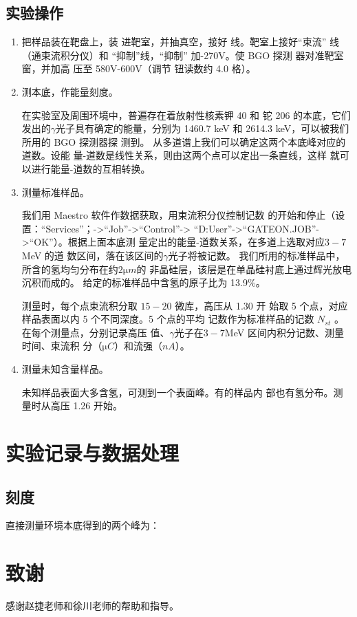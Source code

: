 \documentclass{article}
\begin{document}
\subsection{实验操作}
\begin{enumerate}
\item 把样品装在靶盘上，装
进靶室，并抽真空，接好
线。靶室上接好“束流”
线（通束流积分仪）和
“抑制”线，“抑制”
加-270V。使 BGO 探测
器对准靶室窗，并加高
压至 580V-600V（调节
钮读数约 4.0 格）。
\item 测本底，作能量刻度。

在实验室及周围环境中，普遍存在着放射性核素钾 40 和
铊 206 的本底，它们发出的$\gamma$光子具有确定的能量，分别为
1460.7 keV 和 2614.3 keV，可以被我们所用的 BGO 探测器探
测到。
从多道谱上我们可以确定这两个本底峰对应的道数。设能
量-道数是线性关系，则由这两个点可以定出一条直线，这样
就可以进行能量-道数的互相转换。

\item 测量标准样品。

我们用 Maestro 软件作数据获取，用束流积分仪控制记数
的开始和停止（设置：“Services”；->“Job”->“Control”->
“D:User”->“GATEON.JOB”->“OK”）。根据上面本底测
量定出的能量-道数关系，在多道上选取对应$3-7$MeV 的道
数区间，落在该区间的$\gamma$光子将被记数。
我们所用的标准样品中，所含的氢均匀分布在约$2\si{\micro m}$的
非晶硅层，该层是在单晶硅衬底上通过辉光放电沉积而成的。
给定的标准样品中含氢的原子比为 13.9\%。

测量时，每个点束流积分取 $15-20$ 微库，高压从 1.30 开
始取 5 个点，对应样品表面以内 5 个不同深度。5 个点的平均
记数作为标准样品的记数 $N_{st}$ 。在每个测量点，分别记录高压
值、$\gamma$光子在$3-7$MeV 区间内积分记数、测量时间、束流积
分（$\si{\micro C}$）和流强（$\si{nA}$）。
\item 测量未知含量样品。

未知样品表面大多含氢，可测到一个表面峰。有的样品内
部也有氢分布。测量时从高压 1.26 开始。
 
\end{enumerate}

\section{实验记录与数据处理}
\subsection{刻度}
直接测量环境本底得到的两个峰为：

\section{致谢}
    感谢赵捷老师和徐川老师的帮助和指导。 
\end{document}

